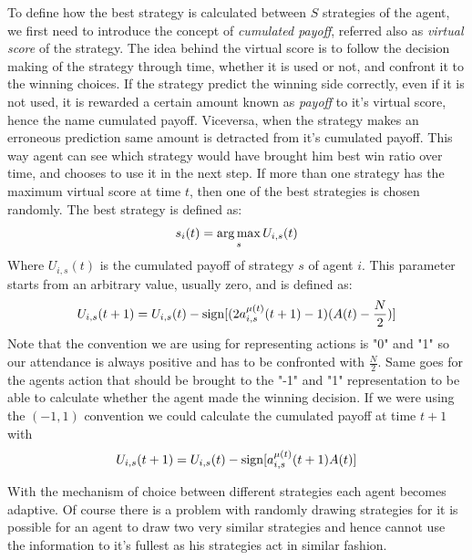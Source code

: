 To define how the best strategy is calculated between $S$ strategies of the agent, we first need to introduce the concept of \textit{cumulated payoff}, referred also as \textit{virtual score }of the strategy. 
The idea behind the virtual score is to follow the decision making of the strategy through time, whether it is used or not, and confront it to the winning choices.
If the strategy predict the winning side correctly, even if it is not used, it is rewarded a certain amount known as \textit{payoff} to it's virtual score, hence the name cumulated payoff.
Viceversa, when the strategy makes an erroneous prediction same amount is detracted from it's cumulated payoff.
This way agent can see which strategy would have brought him best win ratio over time, and chooses to use it in the next step. 
If more than one strategy has the maximum virtual score at time $t$, then one of the best strategies is chosen randomly.
The best strategy is defined as:
\begin{displaymath}
s_i(t) = \operatorname*{arg\,max}_s U_{i,s}(t)
\end{displaymath}
Where $U_{i,s}(t)$ is the cumulated payoff of strategy $s$ of agent $i$.
This parameter starts from an arbitrary value, usually zero, and is defined as:
\begin{displaymath}
U_{i,s}(t+1) = U_{i,s}(t) -  \operatorname{sign}[( 2 a_{i,s}^{\mu(t)}(t+1) - 1 )(A(t) - \frac{N}{2}  )]
\end{displaymath}
Note that the convention we are using for representing actions is "0" and "1" so our attendance is always positive and has to be confronted with $\frac{N}{2}$.
Same goes for the agents action that should be brought to the "-1" and "1" representation to be able to calculate whether the agent made the winning decision.
If we were using the $(-1,1)$ convention we could calculate the cumulated payoff at time $t+1$ with
\begin{displaymath}
U_{i,s}(t+1) = U_{i,s}(t) -  \operatorname{sign}[a_{i,s}^{\mu(t)}(t+1) A(t) ]
\end{displaymath}

With the mechanism of choice between different strategies each agent becomes adaptive.
Of course there is a problem with randomly drawing strategies for it is possible for an agent to draw two very similar strategies and hence cannot use the information to it's fullest as his strategies act in similar fashion.

